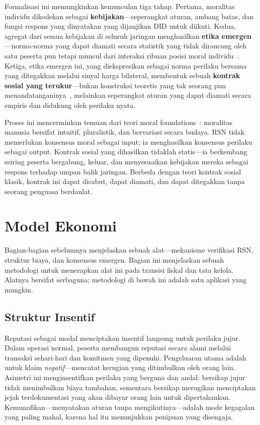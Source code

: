 \documentclass[11pt,a4paper,twocolumn]{article}
\begin{document}
Formalisasi ini memungkinkan kemunculan tiga tahap. Pertama, moralitas individu dikodekan sebagai \textbf{kebijakan}---seperangkat aturan, ambang batas, dan fungsi respons yang dinyatakan yang dijanjikan DID untuk diikuti. Kedua, agregat dari semua kebijakan di seluruh jaringan menghasilkan \textbf{etika emergen}---norma-norma yang dapat diamati secara statistik yang tidak dirancang oleh satu peserta pun tetapi muncul dari interaksi ribuan posisi moral individu~\cite{durkheim1893}. Ketiga, etika emergen ini, yang diekspresikan sebagai norma perilaku bersama yang ditegakkan melalui sinyal harga bilateral, membentuk sebuah \textbf{kontrak sosial yang terukur}---bukan konstruksi teoretis yang tak seorang pun menandatanganinya~\cite{rawls1971}, melainkan seperangkat aturan yang dapat diamati secara empiris dan didukung oleh perilaku nyata.

Proses ini mencerminkan temuan dari teori moral foundations~\cite{haidt2012}: moralitas manusia bersifat intuitif, pluralistik, dan bervariasi secara budaya. RSN tidak memerlukan konsensus moral sebagai input; ia menghasilkan konsensus perilaku sebagai output. Kontrak sosial yang dihasilkan tidaklah statis---ia berkembang seiring peserta bergabung, keluar, dan menyesuaikan kebijakan mereka sebagai respons terhadap umpan balik jaringan. Berbeda dengan teori kontrak sosial klasik, kontrak ini dapat dicabut, dapat diamati, dan dapat ditegakkan tanpa seorang penguasa berdaulat.

\section{Model Ekonomi}

Bagian-bagian sebelumnya menjelaskan sebuah alat---mekanisme verifikasi RSN, struktur biaya, dan konsensus emergen. Bagian ini menjelaskan sebuah metodologi untuk menerapkan alat ini pada transisi fiskal dan tata kelola. Alatnya bersifat serbaguna; metodologi di bawah ini adalah satu aplikasi yang mungkin.

\subsection{Struktur Insentif}

Reputasi sebagai modal menciptakan insentif langsung untuk perilaku jujur. Dalam operasi normal, peserta membangun reputasi secara alami melalui transaksi sehari-hari dan komitmen yang dipenuhi. Pengeluaran utama adalah untuk klaim \emph{negatif}---mencatat kerugian yang ditimbulkan oleh orang lain. Asimetri ini menginsentifkan perilaku yang berguna dan andal: bersikap jujur tidak menimbulkan biaya tambahan, sementara bersikap merugikan menciptakan jejak terdokumentasi yang akan dibayar orang lain untuk dipertahankan. Kemunafikan---menyatakan aturan tanpa mengikutinya---adalah mode kegagalan yang paling mahal, karena hal itu menunjukkan penipuan yang disengaja.
\end{document}
